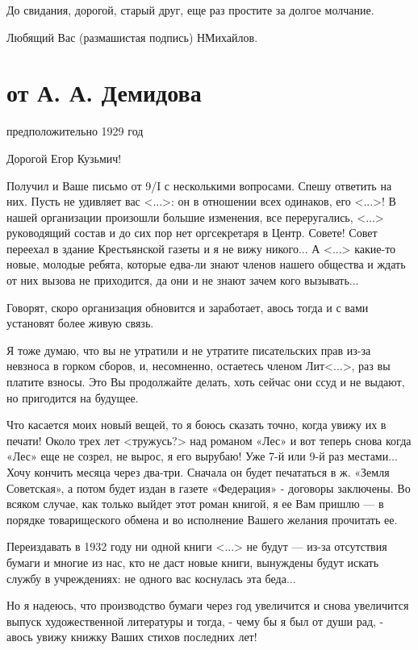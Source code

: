 \documentclass[]{memoir}
\begin{document}
До свидания, дорогой, старый друг, еще раз простите за долгое молчание.

Любящий Вас  (размашистая подпись) НМихайлов.



\section{от А. А. Демидова}

предположительно 1929 год


Дорогой Егор Кузьмич!

Получил и Ваше письмо от 9/I с несколькими вопросами. Спешу ответить на них. Пусть не удивляет вас <...>: он в отношении всех одинаков, его <...>! В нашей организации произошли большие изменения, все переругались, <...> руководящий состав и до сих пор нет оргсекретаря в Центр. Совете! Совет переехал в здание Крестьянской газеты и я не вижу никого... А <...> какие-то новые, молодые ребята, которые едва-ли знают членов нашего общества и ждать от них вызова не приходится, да они и не знают зачем кого вызывать...

Говорят, скоро организация обновится и заработает, авось тогда и с вами установят более живую связь.

Я тоже думаю, что вы не утратили и не утратите писательских прав из-за невзноса в горком сборов, и, несомненно, остаетесь членом Лит<...>, раз вы платите взносы. Это Вы продолжайте делать, хоть сейчас они ссуд и не выдают, но пригодится на будущее.

Что касается моих новый вещей, то я боюсь сказать точно, когда увижу их в печати! Около трех лет <тружусь?> над романом «Лес» и вот теперь снова когда «Лес» еще не созрел, не вырос, я его вырубаю! Уже 7-й или 9-й раз местами... Хочу кончить месяца через два-три. Сначала он будет печататься в ж. «Земля Советская», а потом будет издан в газете «Федерация» - договоры заключены. Во всяком случае, как только выйдет этот роман книгой, я ее Вам пришлю — в порядке товарищеского обмена и во исполнение Вашего желания прочитать ее.

Переиздавать в 1932 году ни одной книги <...> не будут --- из-за отсутствия бумаги и многие из нас, кто не даст новые книги, вынуждены будут искать службу в учреждениях: не одного вас коснулась эта беда...

Но я надеюсь, что производство бумаги через год увеличится и снова увеличится выпуск художественной литературы и тогда, - чему бы я был от души рад, - авось увижу книжку Ваших стихов последних лет!
\end{document}
